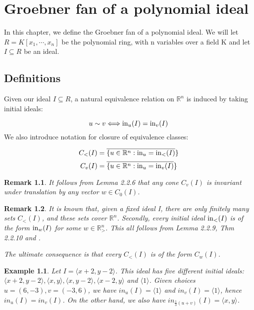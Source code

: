 \documentclass[12pt,a4paper]{report}
\newtheorem{example}{Example}
\newtheorem{remark}{Remark}
\begin{document}
\chapter{Groebner fan of a polynomial ideal}
In this chapter, we define the Groebner fan of a polynomial ideal. We will let $R = K[x_{1}, \cdots, x_{n}]$ be the polynomial ring, with n variables over a field K and let $I \subseteq R$ be an ideal.

\section{Definitions}
Given our ideal $I \subseteq R$, a natural equivalence relation on $\mathbb{R}^{n}$ is induced by taking initial ideals:

\begin{equation*}
    u \sim v \Longleftrightarrow \operatorname{in}_{u} (I) = \operatorname{in}_{v} (I)
\end{equation*}
We also introduce notation for closure of equivalence classes:

\begin{equation*}
    C_{<} (I) = \overline{ \{u \in \mathbb{R}^{n} : \operatorname{in}_{u} = \operatorname{in}_{<} (I)} \}
\end{equation*}
\begin{equation*}
    C_{v} (I) = \overline{ \{u \in \mathbb{R}^{n} : \operatorname{in}_{u} = \operatorname{in}_{v} (I)} \}
\end{equation*}

\begin{remark}
It follows from Lemma 2.2.6 that any cone $C_{v} (I)$ is invariant under translation by any vector $w \in C_{0} (I)$.
\end{remark}


\begin{remark}
It is known that, given a fixed ideal I, there are only finitely many sets $C_{<} (I)$, and these sets cover $\mathbb{R} ^{n}$. Secondly, every initial ideal $\operatorname{in}_{<} (I)$ is of the form $\operatorname{in}_{w} (I)$ for some $w \in \mathbb{R}_{>} ^{n}$. This all follows from Lemma 2.2.9, Thm 2.2.10 and \cite[Lemma 3.1.9]{AndersPHD}.

The ultimate consequence is that every $C_{<} (I)$ is of the form $C_{w} (I)$.
\end{remark}


\begin{example}
Let $I = \langle x + 2, y - 2 \rangle$. This ideal has five different initial ideals: $\langle x+2, y-2 \rangle, \langle x,y \rangle, \langle x,y-2 \rangle, \langle x-2,y \rangle$ and $\langle 1 \rangle$. Given choices $u = (6, -3), v = (-3, 6)$, we have $in_{u} (I) = \langle 1 \rangle$ and $in_{v} (I) = \langle 1 \rangle$, hence $in_{u} (I) = in_{v} (I)$. On the other hand, we also have $in_{\frac{1}{3} (u + v)} (I) = \langle x, y \rangle$.
\end{example}
\end{document}
